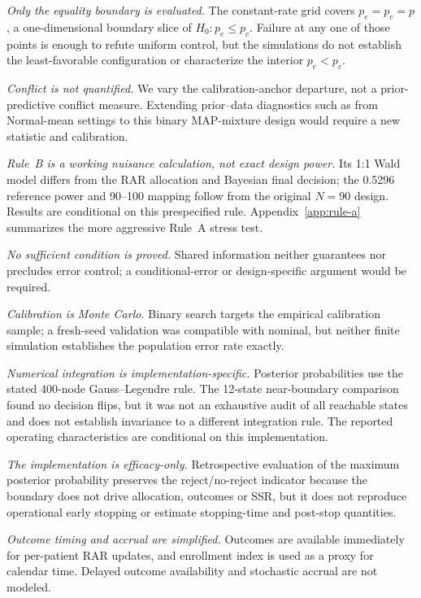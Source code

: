 \documentclass[11pt]{article}
\begin{document}
\emph{Only the equality boundary is evaluated.}  The constant-rate grid covers
$p_e=p_c=p$, a one-dimensional boundary slice of $H_0:p_e\leq p_c$.  Failure at
any one of those points is enough to refute uniform control, but the simulations
do not establish the least-favorable configuration or characterize the interior
$p_e<p_c$.

\emph{Conflict is not quantified.}  We vary the calibration-anchor departure,
not a prior-predictive conflict measure.  Extending prior--data diagnostics such
as \citet{matthews_qian_fms,qian_matthews_fms_ops} from Normal-mean settings to
this binary MAP-mixture design would require a new statistic and calibration.

\emph{Rule~B is a working nuisance calculation, not exact design power.}  Its
1:1 Wald model differs from the RAR allocation and Bayesian final decision; the
0.5296 reference power and 90--100 mapping follow from the original $N=90$
design.  Results are conditional on this prespecified rule.  Appendix~\ref{app:rule-a}
summarizes the more aggressive Rule~A stress test.

\emph{No sufficient condition is proved.}  Shared information neither
guarantees nor precludes error control; a conditional-error or design-specific
argument would be required.

\emph{Calibration is Monte Carlo.}  Binary search targets the empirical
calibration sample; a fresh-seed validation was compatible with nominal, but
neither finite simulation establishes the population error rate exactly.

\emph{Numerical integration is implementation-specific.}  Posterior
probabilities use the stated 400-node Gauss--Legendre rule.  The 12-state
near-boundary comparison found no decision flips, but it was not an exhaustive
audit of all reachable states and does not establish invariance to a different
integration rule.  The reported operating characteristics are conditional on
this implementation.

\emph{The implementation is efficacy-only.}  Retrospective evaluation of the
maximum posterior probability preserves the reject/no-reject indicator because
the boundary does not drive allocation, outcomes or SSR, but it does not
reproduce operational early stopping or estimate stopping-time and post-stop
quantities.

\emph{Outcome timing and accrual are simplified.}  Outcomes are available
immediately for per-patient RAR updates, and enrollment index is used as a proxy
for calendar time.  Delayed outcome availability and stochastic accrual are not
modeled.
\end{document}
